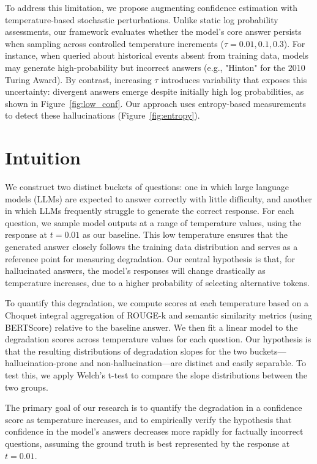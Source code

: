 \documentclass[sigconf]{acmart}
\begin{document}
To address this limitation, we propose augmenting confidence estimation with temperature-based stochastic perturbations. Unlike static log probability assessments, our framework evaluates whether the model's core answer persists when sampling across controlled temperature increments ($\tau = 0.01, 0.1, 0.3$). For instance, when queried about historical events absent from training data, models may generate high-probability but incorrect answers (e.g., "Hinton" for the 2010 Turing Award). By contrast, increasing $\tau$ introduces variability that exposes this uncertainty: divergent answers emerge despite initially high log probabilities, as shown in Figure~\ref{fig:low_conf}. Our approach uses entropy-based measurements to detect these hallucinations (Figure~\ref{fig:entropy}).


\section{Intuition}

We construct two distinct buckets of questions: one in which large language models (LLMs) are expected to answer correctly with little difficulty, and another in which LLMs frequently struggle to generate the correct response. For each question, we sample model outputs at a range of temperature values, using the response at $t = 0.01$ as our baseline. This low temperature ensures that the generated answer closely follows the training data distribution and serves as a reference point for measuring degradation. Our central hypothesis is that, for hallucinated answers, the model's responses will change drastically as temperature increases, due to a higher probability of selecting alternative tokens.

To quantify this degradation, we compute scores at each temperature based on a Choquet integral aggregation of ROUGE-k \cite{lin2004rouge} and semantic similarity metrics (using BERTScore) \cite{bertscore} relative to the baseline answer. We then fit a linear model to the degradation scores across temperature values for each question. Our hypothesis is that the resulting distributions of degradation slopes for the two buckets—hallucination-prone and non-hallucination—are distinct and easily separable. To test this, we apply Welch's t-test to compare the slope distributions between the two groups.

The primary goal of our research is to quantify the degradation in a confidence score as temperature increases, and to empirically verify the hypothesis that confidence in the model's answers decreases more rapidly for factually incorrect questions, assuming the ground truth is best represented by the response at $t = 0.01$.
\end{document}
